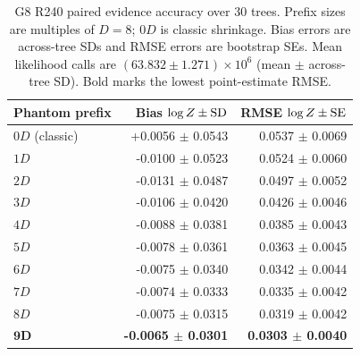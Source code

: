 \documentclass[pdflatex,sn-basic,icol]{sn-jnl}
\theoremstyle{plain}
\theoremstyle{definition}
\begin{document}
\begin{table}[t]
\caption{G8 R240 paired evidence accuracy over 30 trees. Prefix sizes are multiples of $D=8$; $0D$ is classic shrinkage. Bias errors are across-tree SDs and RMSE errors are bootstrap SEs. Mean likelihood calls are $(63.832\pm1.271)\times10^6$ (mean $\pm$ across-tree SD). Bold marks the lowest point-estimate RMSE.}
\label{tab:phantom_evidence_g8}
\centering
\scriptsize
\begin{tabular}{lrr}
\toprule
Phantom prefix & Bias $\log Z\mathbin{\pm}{\rm SD}$ & RMSE $\log Z\mathbin{\pm}{\rm SE}$ \\
\midrule
$0D$ (classic) & +0.0056 $\pm$ 0.0543 & 0.0537 $\pm$ 0.0069 \\
$1D$ & -0.0100 $\pm$ 0.0523 & 0.0524 $\pm$ 0.0060 \\
$2D$ & -0.0131 $\pm$ 0.0487 & 0.0497 $\pm$ 0.0052 \\
$3D$ & -0.0106 $\pm$ 0.0420 & 0.0426 $\pm$ 0.0046 \\
$4D$ & -0.0088 $\pm$ 0.0381 & 0.0385 $\pm$ 0.0043 \\
$5D$ & -0.0078 $\pm$ 0.0361 & 0.0363 $\pm$ 0.0045 \\
$6D$ & -0.0075 $\pm$ 0.0340 & 0.0342 $\pm$ 0.0044 \\
$7D$ & -0.0074 $\pm$ 0.0333 & 0.0335 $\pm$ 0.0042 \\
$8D$ & -0.0075 $\pm$ 0.0315 & 0.0319 $\pm$ 0.0042 \\
$\boldsymbol{9D}$ & \textbf{-0.0065 $\pm$ 0.0301} & \textbf{0.0303 $\pm$ 0.0040} \\
\bottomrule
\end{tabular}
\end{table}
\end{document}
